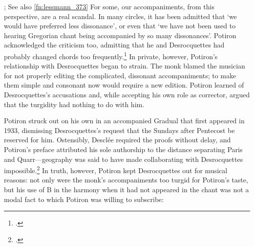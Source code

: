   {\cite[20]{Desrocquettesaccompagnementgregoriendissonances1931}; See also \cref{fn:lessmann_373}}
{For some, our accompaniments, from this perspective, are a real scandal. In many circles, it has been admitted that `we would have preferred less dissonance', or even that `we have not been used to hearing Gregorian chant being accompanied by so many dissonances'.}
\noindent
Potiron acknowledged the criticism too, admitting that he and Desrocquettes had probably changed chords too frequently.\footcite[220]{Potironproposaccompagnementgregorien1930}
In private, however, Potiron's relationship with \mbox{Desrocquettes} began to strain.
The monk blamed the musician for not properly editing the complicated, dissonant accompaniments; to make them simple and consonant now would require a new edition.
Potiron learned of Desrocquettes's accusations and, while accepting his own role as corrector, argued that the turgidity had nothing to do with him.

Potiron struck out on his own in an accompanied Gradual that first appeared in 1933, dismissing Desrocquettes's request that the Sundays after Pentecost be reserved for him.
Ostensibly, Desclée required the proofs without delay, and Potiron's preface attributed his sole authorship to the distance separating Paris and Quarr---geography was said to have made collaborating with Desrocquettes impossible.\footcite[unpaginated `Avant-propos']{PotironGraduelparoissialcontenant1933}
In truth, however, Potiron kept Desrocquettes out for musical reasons: not only were the monk's accompaniments too turgid for Potiron's taste, but his use of B\kern 1pt\flat{} in the harmony when it had not appeared in the chant was not a modal fact to which Potiron was willing to subscribe:

